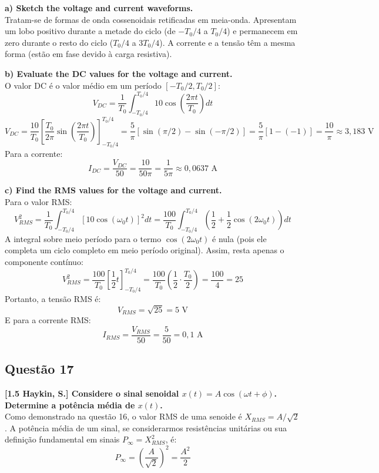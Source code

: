\textbf{a) Sketch the voltage and current waveforms.}\\
Tratam-se de formas de onda cossenoidais retificadas em meia-onda. Apresentam um lobo positivo durante a metade do ciclo (de \(-T_0/4\) a \(T_0/4\)) e permanecem em zero durante o resto do ciclo (\(T_0/4\) a \(3T_0/4\)). A corrente e a tensão têm a mesma forma (estão em fase devido à carga resistiva).

\textbf{b) Evaluate the DC values for the voltage and current.}\\
O valor DC é o valor médio em um período \([-T_0/2, T_0/2]\):
\[V_{DC} = \frac{1}{T_0} \int_{-T_0/4}^{T_0/4} 10\cos\left(\frac{2\pi t}{T_0}\right) dt\]
\[V_{DC} = \frac{10}{T_0} \left[ \frac{T_0}{2\pi} \sin\left(\frac{2\pi t}{T_0}\right) \right]_{-T_0/4}^{T_0/4} = \frac{5}{\pi} \left[ \sin(\pi/2) - \sin(-\pi/2) \right] = \frac{5}{\pi} [1 - (-1)] = \frac{10}{\pi} \approx 3,183 \text{ V}\]
Para a corrente:
\[I_{DC} = \frac{V_{DC}}{50} = \frac{10}{50\pi} = \frac{1}{5\pi} \approx 0,0637 \text{ A}\]

\textbf{c) Find the RMS values for the voltage and current.}\\
Para o valor RMS:
\[V_{RMS}^2 = \frac{1}{T_0} \int_{-T_0/4}^{T_0/4} [10\cos(\omega_0 t)]^2 dt = \frac{100}{T_0} \int_{-T_0/4}^{T_0/4} \left( \frac{1}{2} + \frac{1}{2}\cos(2\omega_0 t) \right) dt\]
A integral sobre meio período para o termo \(\cos(2\omega_0 t)\) é nula (pois ele completa um ciclo completo em meio período original). Assim, resta apenas o componente contínuo:
\[V_{RMS}^2 = \frac{100}{T_0} \left[ \frac{1}{2}t \right]_{-T_0/4}^{T_0/4} = \frac{100}{T_0} \left( \frac{1}{2} \cdot \frac{T_0}{2} \right) = \frac{100}{4} = 25\]
Portanto, a tensão RMS é:
\[V_{RMS} = \sqrt{25} = 5 \text{ V}\]
E para a corrente RMS:
\[I_{RMS} = \frac{V_{RMS}}{50} = \frac{5}{50} = 0,1 \text{ A}\]

\subsection{Questão 17}\label{questuxe3o-17}

\textbf{{[}1.5 Haykin, S.{]} Considere o sinal senoidal \(x(t) = A \cos(\omega t + \phi)\). Determine a potência média de \(x(t)\).}\\
Como demonstrado na questão 16, o valor RMS de uma senoide é \(X_{RMS} = A/\sqrt{2}\). A potência média de um sinal, se considerarmos resistências unitárias ou sua definição fundamental em sinais \(P_\infty = X_{RMS}^2\), é:
\[P_\infty = \left(\frac{A}{\sqrt{2}}\right)^2 = \frac{A^2}{2}\]

